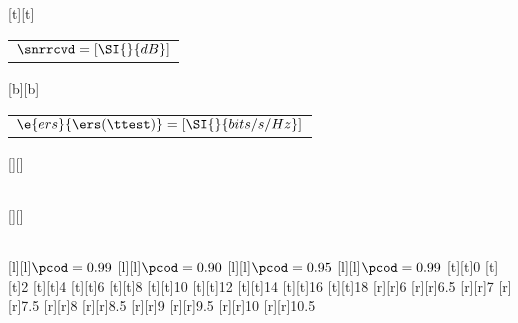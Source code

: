%    
%
%
%
[t][t]{\fontsize{8}{12}\selectfont \color[rgb]{0,0,0}\setlength{\tabcolsep}{0pt}\begin{tabular}{c}$\snrrcvd = [\SI{}{dB}]$\end{tabular}}%
[b][b]{\fontsize{8}{12}\selectfont \color[rgb]{0,0,0}\setlength{\tabcolsep}{0pt}\begin{tabular}{c}$\e{ers}{\ers(\ttest)} = [\SI{}{bits/s/Hz}]$\end{tabular}}%
[][]{\fontsize{10}{15}\selectfont \color[rgb]{0,0,0}\setlength{\tabcolsep}{0pt}\begin{tabular}{c} \end{tabular}}%
[][]{\fontsize{10}{15}\selectfont \color[rgb]{0,0,0}\setlength{\tabcolsep}{0pt}\begin{tabular}{c} \end{tabular}}%
[l][l]{\fontsize{8}{12}\selectfont \color[rgb]{0,0,0}$\pcod = 0.99$}%
[l][l]{\fontsize{8}{12}\selectfont \color[rgb]{0,0,0}$\pcod = 0.90$}%
[l][l]{\fontsize{8}{12}\selectfont \color[rgb]{0,0,0}$\pcod = 0.95$}%
[l][l]{\fontsize{8}{12}\selectfont \color[rgb]{0,0,0}$\pcod = 0.99$}%
%
\fontsize{8}{12}%
\selectfont%
%
[t][t]{0}%
[t][t]{2}%
[t][t]{4}%
[t][t]{6}%
[t][t]{8}%
[t][t]{10}%
[t][t]{12}%
[t][t]{14}%
[t][t]{16}%
[t][t]{18}%
%
[r][r]{6}%
[r][r]{6.5}%
[r][r]{7}%
[r][r]{7.5}%
[r][r]{8}%
[r][r]{8.5}%
[r][r]{9}%
[r][r]{9.5}%
[r][r]{10}%
[r][r]{10.5}%
%
%
